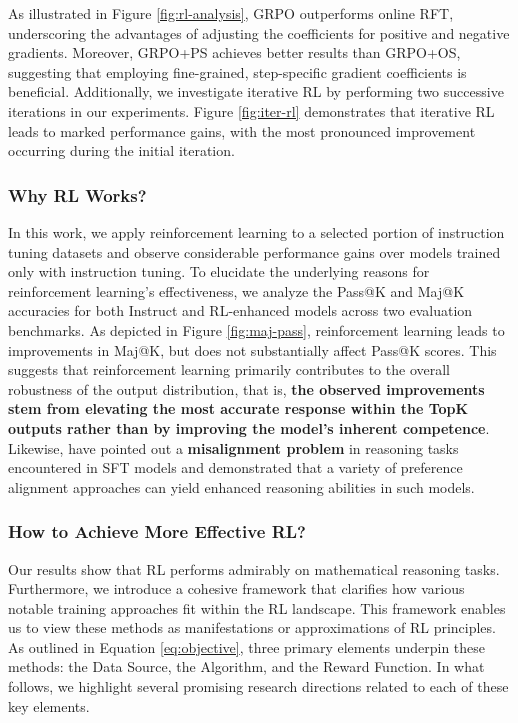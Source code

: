 \begin{itemize}[topsep=0pt]
\begin{itemize}[topsep=0pt]
As illustrated in Figure \ref{fig:rl-analysis}, GRPO outperforms online RFT, underscoring the advantages of adjusting the coefficients for positive and negative gradients. Moreover, GRPO+PS achieves better results than GRPO+OS, suggesting that employing fine-grained, step-specific gradient coefficients is beneficial. Additionally, we investigate iterative RL by performing two successive iterations in our experiments. Figure \ref{fig:iter-rl} demonstrates that iterative RL leads to marked performance gains, with the most pronounced improvement occurring during the initial iteration.

\subsubsection{Why RL Works?} In this work, we apply reinforcement learning to a selected portion of instruction tuning datasets and observe considerable performance gains over models trained only with instruction tuning. To elucidate the underlying reasons for reinforcement learning's effectiveness, we analyze the Pass@K and Maj@K accuracies for both Instruct and RL-enhanced models across two evaluation benchmarks. As depicted in Figure \ref{fig:maj-pass}, reinforcement learning leads to improvements in Maj@K, but does not substantially affect Pass@K scores. This suggests that reinforcement learning primarily contributes to the overall robustness of the output distribution, that is, \textbf{the observed improvements stem from elevating the most accurate response within the TopK outputs rather than by improving the model's inherent competence}. Likewise, \citep{wang2023making} have pointed out a \textbf{misalignment problem} in reasoning tasks encountered in SFT models and demonstrated that a variety of preference alignment approaches \citep{yuan2023rrhf,song2023preference,wang2023making} can yield enhanced reasoning abilities in such models.

\subsubsection{How to Achieve More Effective RL?}
\label{sec:effec_rl}
Our results show that RL performs admirably on mathematical reasoning tasks. Furthermore, we introduce a cohesive framework that clarifies how various notable training approaches fit within the RL landscape. This framework enables us to view these methods as manifestations or approximations of RL principles. As outlined in Equation \ref{eq:objective}, three primary elements underpin these methods: the Data Source, the Algorithm, and the Reward Function. In what follows, we highlight several promising research directions related to each of these key elements.


\end{itemize}
\end{itemize}

